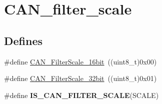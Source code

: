 \hypertarget{group__CAN__filter__scale}{
\section{CAN\_\-filter\_\-scale}
\label{group__CAN__filter__scale}
}
\subsection*{Defines}
\begin{DoxyCompactItemize}
\item 
\#define \hyperlink{group__CAN__filter__scale_ga9e0493937e73bcf9a4127eef2f255a95}{CAN\_\-FilterScale\_\-16bit}~((uint8\_\-t)0x00)
\item 
\#define \hyperlink{group__CAN__filter__scale_gac63dfb0e11713c59268ee9f4aebab60e}{CAN\_\-FilterScale\_\-32bit}~((uint8\_\-t)0x01)
\item 
\#define {\bfseries IS\_\-CAN\_\-FILTER\_\-SCALE}(SCALE)
\end{DoxyCompactItemize}


